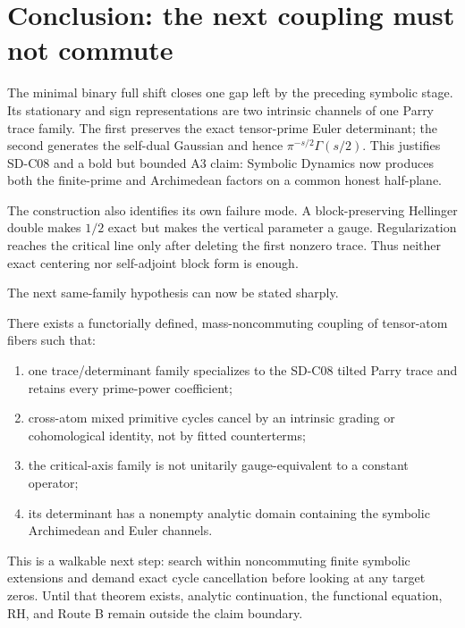 \section{Conclusion: the next coupling must not commute}
\label{sec:conclusion}

The minimal binary full shift closes one gap left by the preceding symbolic
stage. Its stationary and sign representations are two intrinsic channels of
one Parry trace family. The first preserves the exact tensor-prime Euler
determinant; the second generates the self-dual Gaussian and hence
$\pi^{-s/2}\Gamma(s/2)$. This justifies SD-C08 and a bold but bounded A3
claim: Symbolic Dynamics now produces both the finite-prime and Archimedean
factors on a common honest half-plane.

The construction also identifies its own failure mode. A block-preserving
Hellinger double makes $1/2$ exact but makes the vertical parameter a gauge.
Regularization reaches the critical line only after deleting the first
nonzero trace. Thus neither exact centering nor self-adjoint block form is
enough.

The next same-family hypothesis can now be stated sharply.

\begin{conjecture}
\label{conj:coupling}
There exists a functorially defined, mass-noncommuting coupling of tensor-atom
fibers such that:
\begin{enumerate}
  \item one trace/determinant family specializes to the SD-C08 tilted Parry
        trace and retains every prime-power coefficient;
  \item cross-atom mixed primitive cycles cancel by an intrinsic grading or
        cohomological identity, not by fitted counterterms;
  \item the critical-axis family is not unitarily gauge-equivalent to a
        constant operator;
  \item its determinant has a nonempty analytic domain containing the
        symbolic Archimedean and Euler channels.
\end{enumerate}
\end{conjecture}

This is a walkable next step: search within noncommuting finite symbolic
extensions and demand exact cycle cancellation before looking at any target
zeros. Until that theorem exists, analytic continuation, the functional
equation, RH, and Route B remain outside the claim boundary.
